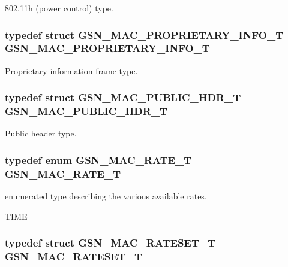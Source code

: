 802.11h (power control) type. 

\hypertarget{a00642_gaf102d7396d0f17159f993324bc63fc03}{
\subsubsection[{GSN\_\-MAC\_\-PROPRIETARY\_\-INFO\_\-T}]{\setlength{\rightskip}{0pt plus 5cm}typedef struct {\bf GSN\_\-MAC\_\-PROPRIETARY\_\-INFO\_\-T}  {\bf GSN\_\-MAC\_\-PROPRIETARY\_\-INFO\_\-T}}}
\label{a00642_gaf102d7396d0f17159f993324bc63fc03}


Proprietary information frame type. 

\hypertarget{a00642_ga83bfac29d319ebdbbc048906db949e06}{
\subsubsection[{GSN\_\-MAC\_\-PUBLIC\_\-HDR\_\-T}]{\setlength{\rightskip}{0pt plus 5cm}typedef struct {\bf GSN\_\-MAC\_\-PUBLIC\_\-HDR\_\-T}  {\bf GSN\_\-MAC\_\-PUBLIC\_\-HDR\_\-T}}}
\label{a00642_ga83bfac29d319ebdbbc048906db949e06}


Public header type. 

\hypertarget{a00642_ga514160bf923e24c122096eecb9350b16}{
\subsubsection[{GSN\_\-MAC\_\-RATE\_\-T}]{\setlength{\rightskip}{0pt plus 5cm}typedef enum {\bf GSN\_\-MAC\_\-RATE\_\-T}  {\bf GSN\_\-MAC\_\-RATE\_\-T}}}
\label{a00642_ga514160bf923e24c122096eecb9350b16}


enumerated type describing the various available rates. 

TIME \hypertarget{a00642_ga3030fec57a589cc8daf2616c8cad3e0d}{
\subsubsection[{GSN\_\-MAC\_\-RATESET\_\-T}]{\setlength{\rightskip}{0pt plus 5cm}typedef struct {\bf GSN\_\-MAC\_\-RATESET\_\-T}  {\bf GSN\_\-MAC\_\-RATESET\_\-T}}}
\label{a00642_ga3030fec57a589cc8daf2616c8cad3e0d}


